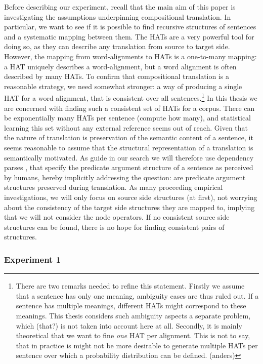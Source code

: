 \documentclass{report}
\theoremstyle{definition}
\theoremstyle{plain}
\begin{document}
Before describing our experiment, recall that the main aim of this paper is investigating the assumptions underpinning compositional translation. In particular, we want to see if it is possible to find recursive structures of sentences and a systematic mapping between them. The HATs are a very powerful tool for doing so, as they can describe any translation from source to target side. However, the mapping from word-alignments to HATs is a one-to-many mapping: a HAT uniquely describes a word-alignment, but a word alignment is often described by many HATs. To confirm that compositional translation is a reasonable strategy, we need somewhat stronger: a way of producing a single HAT for a word alignment, that is consistent over all sentences.\footnote{There are two remarks needed to refine this statement. Firstly we assume that a sentence has only one meaning, ambiguity cases are thus ruled out. If a sentence has multiple meanings, different HATs might correspond to these meanings. This thesis considers such ambiguity aspects a separate problem, which (that?) is not taken into account here at all. Secondly, it is mainly theoretical that we want to fine \textit{one} HAT per alignment. This is not to say, that in practice is might not be more desirable to generate multiple HATs per sentence over which a probability distribution can be defined. (anders)} In this thesis we are concerned with finding such a consistent set of HATs for a corpus. There can be exponentially many HATs per sentence (compute how many), and statistical learning this set without any external reference seems out of reach. Given that the nature of translation is preservation of the semantic content of a sentence, it seems reasonable to assume that the structural representation of a translation is semantically motivated. As guide in our search we will therefore use dependency parses \cite{schubert1987metataxis}, that specify the predicate argument structure of a sentence as perceived by humans, hereby implicitly addressing the question: are predicate argument structures preserved during translation. As many proceeding empirical investigations, we will only focus on source side structures (at first), not worrying about the consistency of the target side structures they are mapped to, implying that we will not consider the node operators. If no consistent source side structures can be found, there is no hope for finding consistent pairs of structures.

\subsubsection{Experiment 1}
\end{document}
